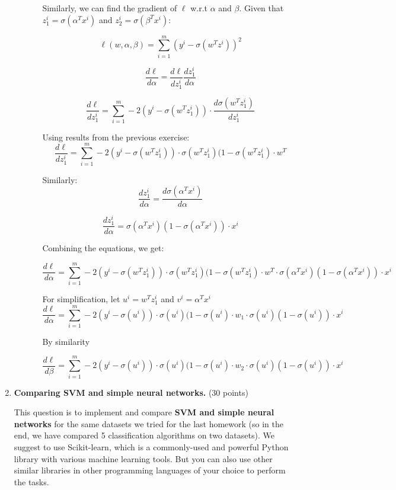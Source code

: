 \documentclass[twoside,10pt]{article}
\begin{document}
\begin{enumerate}
\begin{enumerate}
\begin{itemize}
Similarly, we can find the gradient of $\ell$ w.r.t $\alpha$ and $\beta$. Given that $z_1^i = \sigma(\alpha^T x^i)$ and $z_2^i = \sigma(\beta^T x^i)$:

$$
\ell(w, \alpha, \beta) = \sum_{i=1}^m (y^i - \sigma(w^T z^i))^2
$$

$$ \frac{d \ell}{d \alpha} = \frac{d \ell}{d z_1^i} \frac{d z_1^i}{d \alpha}$$

$$
\frac{d \ell}{d z_1^i} = \sum_{i=1}^m -2 (y^i - \sigma(w^T z_1^i)) \cdot \frac{d \sigma(w^T z_1^i)}{d z_1^i}	
$$

Using results from the previous exercise:
$$
\frac{d \ell}{d z_1^i} = \sum_{i=1}^m -2 (y^i - \sigma(w^T z_1^i)) \cdot 	
\sigma(w^T z_1^i)(1-\sigma(w^T z_1^i) \cdot w^T 
$$

Similarly:
$$
\frac{d z_1^i}{d \alpha} = \frac{d \sigma(\alpha^T x^i)}{d \alpha}
$$

$$
\frac{d z_1^i}{d \alpha} = \sigma(\alpha^T x^i)(1-\sigma(\alpha^T x^i))\cdot x^i 
$$

Combining the equations, we get:

$$ 
\frac{d \ell}{d \alpha} = \sum_{i=1}^m -2 (y^i - \sigma(w^T z_1^i)) \cdot 	
\sigma(w^T z_1^i)(1-\sigma(w^T z_1^i) \cdot w^T \cdot \sigma(\alpha^T x^i)(1-\sigma(\alpha^T x^i))\cdot x^i $$

For simplification, let $u^i = w^T z_1^i$ and $v^i = \alpha^T x^i$
$$ 
\frac{d \ell}{d \alpha} = \sum_{i=1}^m -2 (y^i - \sigma(u^i)) \cdot 	
\sigma(u^i)(1-\sigma(u^i) \cdot w_1 \cdot \sigma(u^i)(1-\sigma(u^i))\cdot x^i $$


By similarity

$$ 
\frac{d \ell}{d \beta} = \sum_{i=1}^m -2 (y^i - \sigma(u^i)) \cdot 	
\sigma(u^i)(1-\sigma(u^i) \cdot w_2 \cdot \sigma(u^i)(1-\sigma(u^i))\cdot x^i $$


\end{itemize}
\end{enumerate}


\item {\bf Comparing SVM and simple neural networks.} (30 points)

This question is to implement and compare {\bf SVM and simple neural networks} for the same datasets we tried for the last homework (so in the end, we have compared 5 classification algorithms on two datasets). We suggest to use \textsf{Scikit-learn}, which is a commonly-used and powerful \textsf{Python} library with various machine learning tools. But you can also use other similar libraries in other programming languages of your choice to perform the tasks. 


\end{enumerate}
\end{document}
